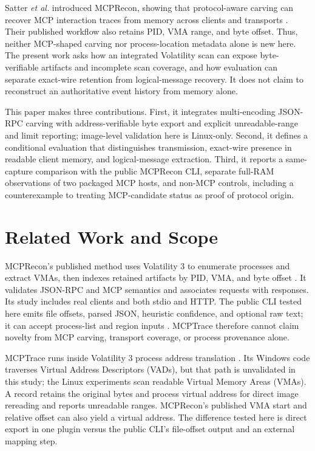 \documentclass[conference,10pt]{IEEEtran}
\begin{document}
Satter \emph{et al.} introduced MCPRecon, showing that protocol-aware carving can recover MCP interaction traces from memory across clients and transports \cite{mcprecon-paper}. Their published workflow also retains PID, VMA range, and byte offset. Thus, neither MCP-shaped carving nor process-location metadata alone is new here. The present work asks how an integrated Volatility scan can expose byte-verifiable artifacts and incomplete scan coverage, and how evaluation can separate exact-wire retention from logical-message recovery. It does not claim to reconstruct an authoritative event history from memory alone.

This paper makes three contributions. First, it integrates multi-encoding JSON-RPC carving with address-verifiable byte export and explicit unreadable-range and limit reporting; image-level validation here is Linux-only. Second, it defines a conditional evaluation that distinguishes transmission, exact-wire presence in readable client memory, and logical-message extraction. Third, it reports a same-capture comparison with the public MCPRecon CLI, separate full-RAM observations of two packaged MCP hosts, and non-MCP controls, including a counterexample to treating MCP-candidate status as proof of protocol origin.

\section{Related Work and Scope}
MCPRecon's published method uses Volatility 3 to enumerate processes and extract VMAs, then indexes retained artifacts by PID, VMA, and byte offset \cite{mcprecon-paper}. It validates JSON-RPC and MCP semantics and associates requests with responses. Its study includes real clients and both stdio and HTTP. The public CLI tested here emits file offsets, parsed JSON, heuristic confidence, and optional raw text; it can accept process-list and region inputs \cite{mcprecon-code}. MCPTrace therefore cannot claim novelty from MCP carving, transport coverage, or process provenance alone.

MCPTrace runs inside Volatility 3 process address translation \cite{volatility}. Its Windows code traverses Virtual Address Descriptors (VADs), but that path is unvalidated in this study; the Linux experiments scan readable Virtual Memory Areas (VMAs). A record retains the original bytes and process virtual address for direct image rereading and reports unreadable ranges. MCPRecon's published VMA start and relative offset can also yield a virtual address. The difference tested here is direct export in one plugin versus the public CLI's file-offset output and an external mapping step.
\end{document}
